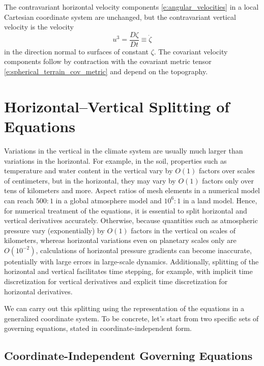 \documentclass{report}
\begin{document}
The contravariant horizontal velocity components \eqref{e:angular_velocities} in a local Cartesian coordinate system are unchanged, but the contravariant vertical velocity is the velocity
\[
u^3 = \frac{D\zeta}{Dt} \equiv \dot\zeta
\]
in the direction normal to surfaces of constant $\zeta$. The covariant velocity components follow by contraction with the covariant metric tensor \eqref{e:spherical_terrain_cov_metric} and depend on the topography.


\section{Horizontal--Vertical Splitting of Equations}

Variations in the vertical in the climate system are usually much larger than variations in the horizontal. For example, in the soil, properties such as temperature and water content  in the vertical vary by $O(1)$ factors over scales of centimeters, but in the horizontal, they may vary by $O(1)$ factors only over tens of kilometers and more. Aspect ratios of mesh elements in a numerical model can reach $500:1$ in a global atmosphere model and $10^6:1$ in a land model. Hence, for numerical treatment of the equations, it is essential to split horizontal and vertical derivatives accurately. Otherwise, because quantities such as atmospheric pressure vary (exponentially) by $O(1)$ factors in the vertical on scales of kilometers, whereas horizontal variations even on planetary scales only are $O(10^{-2})$, calculations of horizontal pressure gradients can become inaccurate, potentially with large errors in large-scale dynamics. Additionally, splitting of the horizontal and vertical facilitates time stepping, for example, with implicit time discretization for vertical derivatives and explicit time discretization for horizontal derivatives. 

We can carry out this splitting using the representation of the equations in a generalized coordinate system. To be concrete, let's start from two specific sets of governing equations, stated in coordinate-independent form. 

\subsection{Coordinate-Independent Governing Equations}
\end{document}
